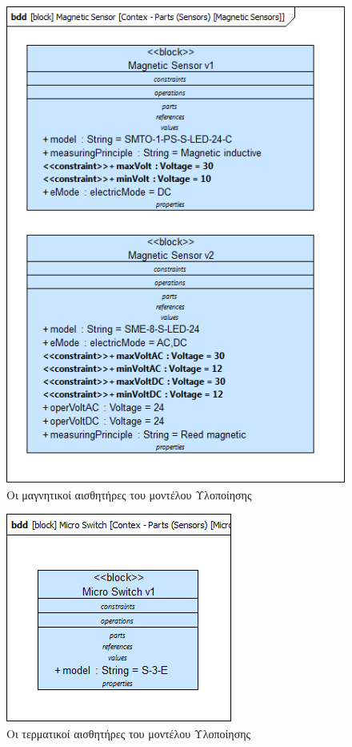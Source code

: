 \documentclass[a4paper,12pt,twoside]{report}
\begin{document}
{\begin{appendices}
				\begin{figure}[hp]
					\centering
					\includegraphics[scale=0.50]{DesignModel_Contex-Parts(Sensors)[MagneticSensors].png}
					\caption{Οι μαγνητικοί αισθητήρες του μοντέλου Υλοποίησης}
					\label{φωτ:Οι μαγνητικοί αισθητήρες του μοντέλου Υλοποίησης}
				\end{figure}
				
				\begin{figure}[hp]
					\centering
					\includegraphics[scale=0.50]{DesignModel_Contex-Parts(Sensors)[MicroSwitch].png}
					\caption{Οι τερματικοί αισθητήρες του μοντέλου Υλοποίησης}
					\label{φωτ:Οι τερματικοί αισθητήρες του μοντέλου Υλοποίησης}
				\end{figure}
				

\end{appendices}}
\end{document}
